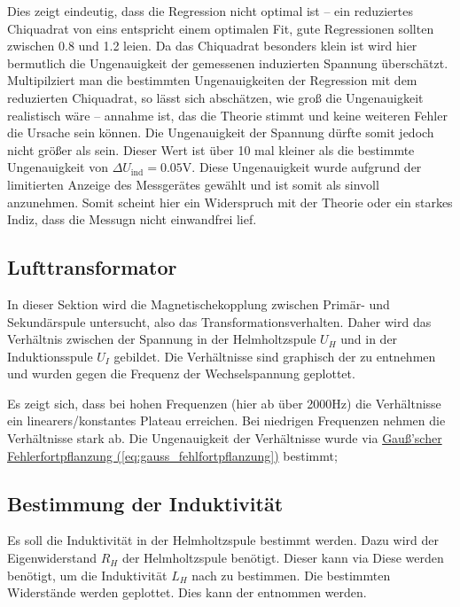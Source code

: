 Dies zeigt eindeutig, dass die Regression nicht optimal ist -- ein reduziertes Chiquadrat von eins entspricht einem optimalen Fit, gute Regressionen sollten zwischen 0.8 und 1.2 leien. Da das Chiquadrat besonders klein ist wird hier bermutlich die Ungenauigkeit der gemessenen induzierten Spannung überschätzt.
Multipilziert man die bestimmten Ungenauigkeiten der Regression mit dem reduzierten Chiquadrat, so lässt sich abschätzen, wie groß die Ungenauigkeit realistisch wäre -- annahme ist, das die Theorie stimmt und keine weiteren Fehler die Ursache sein können. Die Ungenauigkeit der Spannung dürfte somit jedoch nicht größer als
sein. Dieser Wert ist über 10 mal kleiner als die bestimmte Ungenauigkeit von $\Delta U_\text{ind} = 0.05 \mathrm{V}$. Diese Ungenauigkeit wurde aufgrund der limitierten Anzeige des Messgerätes gewählt und ist somit als sinvoll anzunehmen. 
Somit scheint hier ein Widerspruch mit der Theorie oder ein starkes Indiz, dass die Messugn nicht einwandfrei lief.

\subsection{Lufttransformator}
In dieser Sektion wird die Magnetischekopplung zwischen Primär- und Sekundärspule untersucht, also das Transformationsverhalten. Daher wird das Verhältnis zwischen der Spannung in der Helmholtzspule $U_H$ und in der Induktionsspule $U_I$ gebildet. 
Die Verhältnisse sind graphisch der  zu entnehmen und wurden gegen die Frequenz der Wechselspannung geplottet.

Es zeigt sich, dass bei hohen Frequenzen (hier ab über 2000Hz) die Verhältnisse ein linearers/konstantes Plateau erreichen. Bei niedrigen Frequenzen nehmen die Verhältnisse stark ab.
Die Ungenauigkeit der Verhältnisse wurde via \hyperref[eq:gauss_fehlfortpflanzung]{Gauß'scher Fehlerfortpflanzung (\ref*{eq:gauss_fehlfortpflanzung})} bestimmt;

\subsection{Bestimmung der Induktivität}
Es soll die Induktivität in der Helmholtzspule bestimmt werden. Dazu wird der Eigenwiderstand $R_H$ der Helmholtzspule benötigt. Dieser kann via
Diese werden benötigt, um die Induktivität $L_H$ nach  zu bestimmen.
Die bestimmten Widerstände werden geplottet. Dies kann der  entnommen werden.


